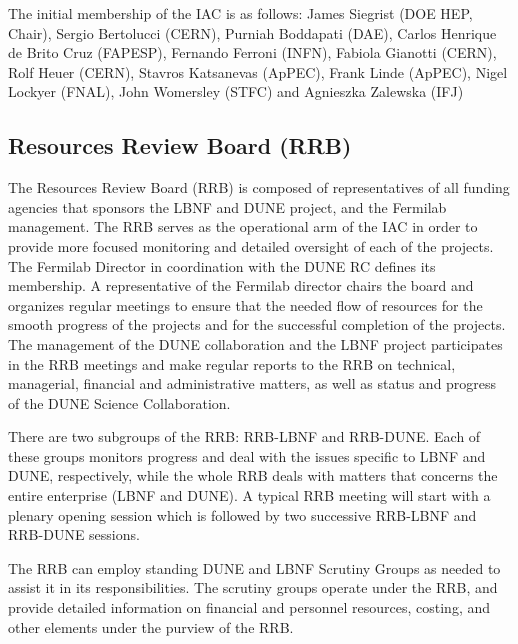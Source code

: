 The initial membership of the IAC is as follows:
James Siegrist (DOE HEP, Chair),
Sergio Bertolucci (CERN),
Purniah Boddapati (DAE),
Carlos Henrique de Brito Cruz (FAPESP),
Fernando Ferroni (INFN),
Fabiola Gianotti (CERN),
Rolf Heuer (CERN),
Stavros Katsanevas (ApPEC),
Frank Linde (ApPEC),
Nigel Lockyer (FNAL),
John Womersley (STFC) and
Agnieszka Zalewska (IFJ)

\subsection{Resources Review Board (RRB)}

The Resources Review Board (RRB) is composed of representatives of all
funding agencies that sponsors the LBNF and DUNE project, and the Fermilab
management. The RRB serves as the operational arm of the IAC
in order to provide more focused monitoring and detailed oversight
of each of the projects. The Fermilab Director in coordination
with the DUNE RC defines its membership. A representative of the
Fermilab director chairs the board and
organizes regular meetings to ensure that the needed flow of resources
for the smooth progress of the projects and for the successful completion
of the projects. The management of the
DUNE collaboration and the LBNF project participates in the RRB meetings
and make regular reports to the RRB on technical, managerial,
financial and administrative matters, as well as status and
progress of the DUNE Science Collaboration.

There are two subgroups of the RRB: RRB-LBNF and RRB-DUNE. Each of
these groups monitors progress and deal with the issues specific to
LBNF and DUNE, respectively, while the whole RRB deals with matters
that concerns the entire enterprise (LBNF and DUNE). A typical RRB meeting
will start with a plenary opening session which is followed by two
successive RRB-LBNF and RRB-DUNE sessions.

The RRB can employ standing DUNE and LBNF Scrutiny Groups as needed
to assist it in its responsibilities. The scrutiny groups operate
under the RRB, and provide detailed information on financial and
personnel resources, costing, and other elements under the purview of the RRB.

